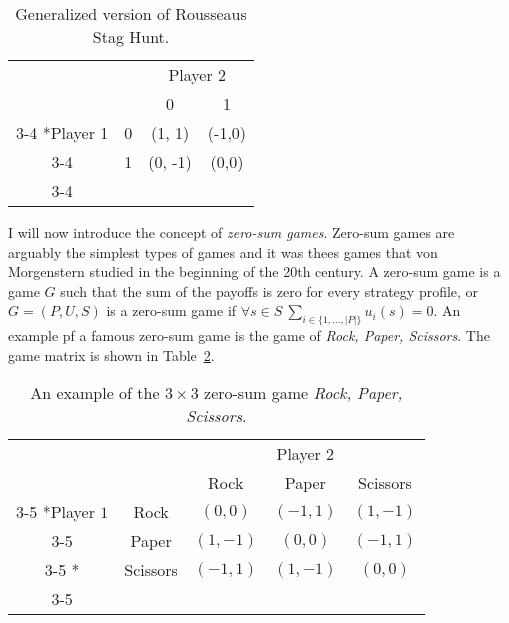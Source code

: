 \documentclass{article}
\theoremstyle{definition}
\theoremstyle{remark}
\begin{document}
\begin{table}[h!]
  \centering
  \setlength{\extrarowheight}{2pt}
  \begin{tabular}{cc|c|c|}
    & \multicolumn{1}{c}{} & \multicolumn{2}{c}{Player 2}\\
    & \multicolumn{1}{c}{} & \multicolumn{1}{c}{0}  &
                                                              \multicolumn{1}{c}{1}
    \\\cline{3-4}
\multirow{2}*{Player 1}  & 0 & (1, 1) &
                                                                   (-1,0) \\\cline{3-4}
    & 1 & (0, -1) & (0,0) \\\cline{3-4}
  \end{tabular}
  \caption{Generalized version of Rousseaus Stag Hunt.}
  \label{Stag Hunt 2}
\end{table}

I will now introduce the concept of \emph{zero-sum games}. Zero-sum
games are arguably the simplest types of games and it was thees games
that von Morgenstern studied in the beginning of the 20th century. A
zero-sum game is a game $G$ such that the sum of the payoffs is zero
for every strategy profile, or $G = (P,U,S)$ is a zero-sum game if $\forall s
\in S~\sum_{i \in \{1,...,|P|\}} u_i(s) = 0$. An example pf a famous
zero-sum game is the game of \emph{Rock, Paper, Scissors}. The game
matrix is shown in Table~\ref{Rock Paper Scissors}.\\

\begin{table}[h!]
  \begin{center}
    \setlength{\extrarowheight}{2pt}
    \begin{tabular}{cc|c|c|c|}
      & \multicolumn{2}{c}{} & \multicolumn{1}{c}{Player $2$} & \multicolumn{1}{c}{}\\
      & \multicolumn{1}{c}{} & \multicolumn{1}{c}{Rock}  &
                                                          \multicolumn{1}{c}{Paper} & \multicolumn{1}{c}{Scissors} \\\cline{3-5}
      \multirow{2}*{Player $1$}  & Rock & $(0,0)$ & $(-1,1)$ & $(1,-1)$\\\cline{3-5}
      & Paper & $(1,-1)$ & $(0,0)$ & $(-1,1)$\\\cline{3-5}
           \multirow{1}*{}  & Scissors & $(-1,1)$ & $(1,-1)$ & $(0,0)$\\\cline{3-5}   \end{tabular}
    \caption{An example of the $3\times 3$ zero-sum game \emph{Rock,
        Paper, Scissors}.}
    \label{Rock Paper Scissors}
    \end{center}
  \end{table}
\end{document}
